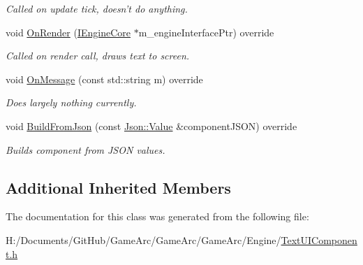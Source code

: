 \begin{DoxyCompactItemize}
\begin{DoxyCompactList}\small\item\em Called on update tick, doesn't do anything. \end{DoxyCompactList}\item 
\hypertarget{class_text_u_i_component_aca5ef2d0ab17d8f8851c41391acc1d3b}{void \hyperlink{class_text_u_i_component_aca5ef2d0ab17d8f8851c41391acc1d3b}{On\+Render} (\hyperlink{class_i_engine_core}{I\+Engine\+Core} $\ast$m\+\_\+engine\+Interface\+Ptr) override}\label{class_text_u_i_component_aca5ef2d0ab17d8f8851c41391acc1d3b}

\begin{DoxyCompactList}\small\item\em Called on render call, draws text to screen. \end{DoxyCompactList}\item 
\hypertarget{class_text_u_i_component_a830dc9a5050fdc98d11b23fa6effd815}{void \hyperlink{class_text_u_i_component_a830dc9a5050fdc98d11b23fa6effd815}{On\+Message} (const std\+::string m) override}\label{class_text_u_i_component_a830dc9a5050fdc98d11b23fa6effd815}

\begin{DoxyCompactList}\small\item\em Does largely nothing currently. \end{DoxyCompactList}\item 
\hypertarget{class_text_u_i_component_a780908f34b0ed8c49481af4c811a6279}{void \hyperlink{class_text_u_i_component_a780908f34b0ed8c49481af4c811a6279}{Build\+From\+Json} (const \hyperlink{class_json_1_1_value}{Json\+::\+Value} \&component\+J\+S\+O\+N) override}\label{class_text_u_i_component_a780908f34b0ed8c49481af4c811a6279}

\begin{DoxyCompactList}\small\item\em Builds component from J\+S\+O\+N values. \end{DoxyCompactList}\end{DoxyCompactItemize}
\subsection*{Additional Inherited Members}


The documentation for this class was generated from the following file\+:\begin{DoxyCompactItemize}
\item 
H\+:/\+Documents/\+Git\+Hub/\+Game\+Arc/\+Game\+Arc/\+Game\+Arc/\+Engine/\hyperlink{_text_u_i_component_8h}{Text\+U\+I\+Component.\+h}\end{DoxyCompactItemize}
